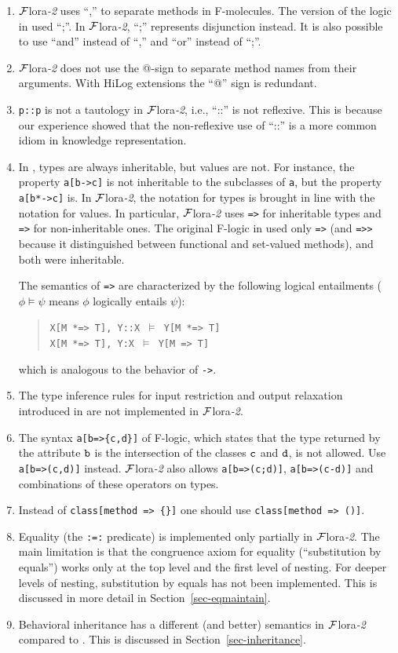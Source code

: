 \documentclass[11pt]{article}
\newcommand{\FLORA}{{\mbox{\sc ${\cal F}${lora}\rm\emph{-2}}}\xspace}
\newcommand{\fl}{\mbox{F-logic}\xspace}
\begin{document}
\begin{enumerate}
\item \FLORA uses ``,'' to separate methods in F-molecules. The version of
  the logic in \cite{KLW95} used ``;''. In \FLORA, ``;'' represents
  disjunction instead. It is also possible to use ``and'' instead of ``,''
  and ``or'' instead of ``;''.
\item \FLORA does not use the @-sign to separate method names from their
  arguments. With HiLog extensions the ``@'' sign is redundant.
\item  {\tt p::p} is not a tautology in \FLORA, i.e., ``::'' is not
  reflexive. This is because our experience showed that the non-reflexive
  use of ``::'' is a more common idiom in knowledge representation.
\item In \cite{KLW95}, types are always inheritable, but values are not.
  For instance, the property {\tt a[b->c]} is not inheritable to the
  subclasses of {\tt a}, but the property {\tt a[b*->c]} is.  In \FLORA,
  the notation for types is brought in line with the notation for values.
  In particular, \FLORA uses {\tt *=>} for inheritable types
  and {\tt =>} for non-inheritable ones. The original F-logic in
  \cite{KLW95} used only {\tt =>} (and {\tt =>>} because it distinguished
  between functional and set-valued methods), and both were inheritable.

  The semantics of {\tt *=>} are
  characterized by the following logical entailments ($\phi \models \psi$
  means $\phi$ logically entails $\psi$):
  \begin{quote}
    {\tt X[M *=> T], Y::X $\models$ Y[M *=> T]}\\
    {\tt X[M *=> T], Y:X $\models$ Y[M => T]}
  \end{quote}
  which is analogous to the behavior of {\tt ->}.
\item The type inference rules for input restriction and output
  relaxation introduced in \cite{KLW95} are not implemented in \FLORA.
\item The syntax {\tt a[b=>\{c,d\}]} of \fl, which states that the type
  returned by the attribute $\tt b$ is the intersection of the classes $\tt c$ and
  $\tt d$, is not allowed. Use {\tt a[b=>(c,d)]} instead. \FLORA also allows
  {\tt a[b=>(c;d)]}, {\tt a[b=>(c-d)]} and combinations of these operators on
  types.
\item Instead of {\tt class[method => \{\}]}
  one should use {\tt class[method => ()]}.
\item Equality (the {\tt :=:} predicate) is implemented only partially in
  \FLORA. The main limitation is that the congruence axiom for equality
  (``substitution by equals'') works only at the top level and the first
  level of nesting.  For deeper levels of nesting, substitution by equals
  has not been implemented. This is discussed in more detail in
  Section~\ref{sec-eqmaintain}.
\item Behavioral inheritance has a different (and better) semantics in
  \FLORA compared to \cite{KLW95}.
  This is discussed in Section~\ref{sec-inheritance}.
\end{enumerate}
\end{document}
